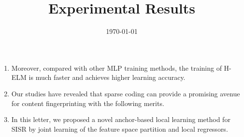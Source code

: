 \documentclass[onecolumn,conference]{IEEEtran}
\begin{document}
\title{Experimental Results}
\author{\today}
\maketitle
\begin{enumerate} 
\item Moreover, compared with other MLP training methods, the training of H-ELM is much faster and achieves higher learning accuracy. \cite{Tang2015}
\item Our studies have revealed that sparse coding can provide a promising avenue for content fingerprinting with the following merits. \cite{Yue2015}
\item In this letter, we proposed a novel anchor-based local learning method for SISR by joint learning of the feature space partition and local regressors. \cite{Zhang2016}
\end{enumerate}


\end{document}
